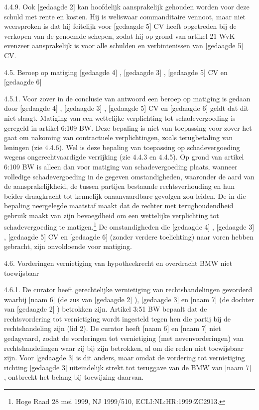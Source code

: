 \documentclass[
  dutch,
  a4paper,
]{article}
\begin{document}
4.4.9. Ook {[}gedaagde 2{]} kan hoofdelijk aansprakelijk gehouden worden voor deze schuld met rente en kosten. Hij is weliswaar commanditaire vennoot, maar niet weersproken is dat hij feitelijk voor {[}gedaagde 5{]} CV heeft opgetreden bij de verkopen van de genoemde schepen, zodat hij op grond van artikel 21 WvK evenzeer aansprakelijk is voor alle schulden en verbintenissen van {[}gedaagde 5{]} CV.

4.5. Beroep op matiging {[}gedaagde 4{]} , {[}gedaagde 3{]} , {[}gedaagde 5{]} CV en {[}gedaagde 6{]}

4.5.1. Voor zover in de conclusie van antwoord een beroep op matiging is gedaan door {[}gedaagde 4{]} , {[}gedaagde 3{]} , {[}gedaagde 5{]} CV en {[}gedaagde 6{]} geldt dat dit niet slaagt. Matiging van een wettelijke verplichting tot schadevergoeding is geregeld in artikel 6:109 BW. Deze bepaling is niet van toepassing voor zover het gaat om nakoming van contractuele verplichtingen, zoals terugbetaling van leningen (zie 4.4.6). Wel is deze bepaling van toepassing op schadevergoeding wegens ongerechtvaardigde verrijking (zie 4.4.3 en 4.4.5). Op grond van artikel 6:109 BW is alleen dan voor matiging van schadevergoeding plaats, wanneer volledige schadevergoeding in de gegeven omstandigheden, waaronder de aard van de aansprakelijkheid, de tussen partijen bestaande rechtsverhouding en hun beider draagkracht tot kennelijk onaanvaardbare gevolgen zou leiden. De in die bepaling neergelegde maatstaf maakt dat de rechter met terughoudendheid gebruik maakt van zijn bevoegdheid om een wettelijke verplichting tot schadevergoeding te matigen.\footnote{Hoge Raad 28 mei 1999, NJ 1999/510, ECLI:NL:HR:1999:ZC2913.} De omstandigheden die {[}gedaagde 4{]} , {[}gedaagde 3{]} , {[}gedaagde 5{]} CV en {[}gedaagde 6{]} (zonder verdere toelichting) naar voren hebben gebracht, zijn onvoldoende voor matiging.

4.6. Vorderingen vernietiging van hypotheekrecht en overdracht BMW niet toewijsbaar

4.6.1. De curator heeft gerechtelijke vernietiging van rechtshandelingen gevorderd waarbij {[}naam 6{]} (de zus van {[}gedaagde 2{]} ), {[}gedaagde 3{]} en {[}naam 7{]} (de dochter van {[}gedaagde 2{]} ) betrokken zijn. Artikel 3:51 BW bepaalt dat de rechtsvordering tot vernietiging wordt ingesteld tegen hen die partij bij de rechtshandeling zijn (lid 2). De curator heeft {[}naam 6{]} en {[}naam 7{]} niet gedagvaard, zodat de vorderingen tot vernietiging (met nevenvorderingen) van rechtshandelingen waar zij bij zijn betrokken, al om die reden niet toewijsbaar zijn. Voor {[}gedaagde 3{]} is dit anders, maar omdat de vordering tot vernietiging richting {[}gedaagde 3{]} uiteindelijk strekt tot teruggave van de BMW van {[}naam 7{]} , ontbreekt het belang bij toewijzing daarvan.
\end{document}
